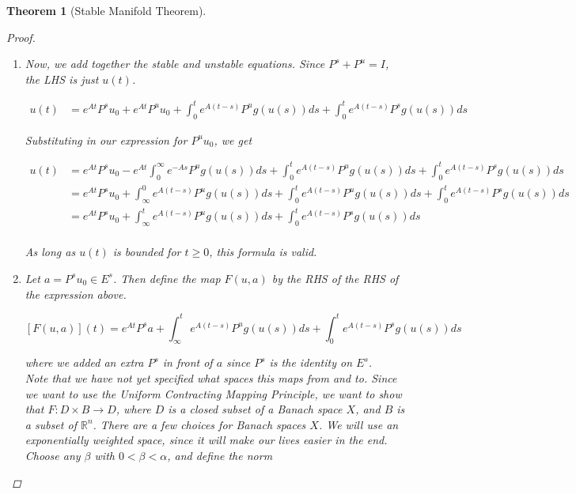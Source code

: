 \documentclass{article}
\newtheorem{theorem}{Theorem}[section]
\def\R{{\mathbb R}}
\begin{document}
\begin{theorem}[Stable Manifold Theorem]
\begin{proof}
\begin{enumerate}
\begin{align*}
\left| \int_0^\infty e^{-As} P^u g(u(s)) ds \right| 
&\leq \int_0^\infty || e^{-As} P^u || L(\rho) |u(s)| ds \\
&\leq M L(\rho) \rho \int_0^\infty e^{-\alpha s} ds < \infty
\end{align*}

Thus, as long as $u(t)$ is bounded for $t \geq 0$, we can solve for $P^u u_0$ to get

\begin{align*}
P^u u_0 &= -\int_0^\infty e^{-As} P^u g(u(s)) ds
\end{align*}

\item Now, we add together the stable and unstable equations. Since $P^s + P^u = I$, the LHS is just $u(t)$. 

\begin{align*}
u(t) &= e^{At} P^s u_0 + e^{At} P^u u_0 + \int_0^t e^{A(t-s)} P^u g(u(s)) ds + \int_0^t e^{A(t-s)} P^s g(u(s)) ds
\end{align*}

Substituting in our expression for $P^u u_0$, we get

\begin{align*}
u(t) &= e^{At} P^s u_0 - e^{At} \int_0^\infty e^{-As} P^u g(u(s)) ds + \int_0^t e^{A(t-s)} P^u g(u(s)) ds + \int_0^t e^{A(t-s)} P^s g(u(s)) ds \\
&= e^{At} P^s u_0 + \int_\infty^0 e^{A(t-s)} P^u g(u(s)) ds + \int_0^t e^{A(t-s)} P^u g(u(s)) ds + \int_0^t e^{A(t-s)} P^s g(u(s)) ds \\
&= e^{At} P^s u_0 + \int_\infty^t e^{A(t-s)} P^u g(u(s)) ds + \int_0^t e^{A(t-s)} P^s g(u(s)) ds \\
\end{align*}

As long as $u(t)$ is bounded for $t \geq 0$, this formula is valid.

\item Let $a = P^s u_0 \in E^s$. Then define the map $F(u, a)$ by the RHS of the RHS of the expression above.

\[
[F(u, a)](t) = e^{At} P^s a + \int_\infty^t e^{A(t-s)} P^u g(u(s)) ds + \int_0^t e^{A(t-s)} P^s g(u(s)) ds
\]

where we added an extra $P^s$ in front of $a$ since $P^s$ is the identity on $E^s$.\\

Note that we have not yet specified what spaces this maps from and to. Since we want to use the Uniform Contracting Mapping Principle, we want to show that $F: D \times B \rightarrow D$, where $D$ is a closed subset of a Banach space $X$, and $B$ is a subset of $\R^n$. There are a few choices for Banach spaces $X$. We will use an exponentially weighted space, since it will make our lives easier in the end. Choose any $\beta$ with $0 < \beta < \alpha$, and define the norm


\end{enumerate}
\end{proof}
\end{theorem}
\end{document}

